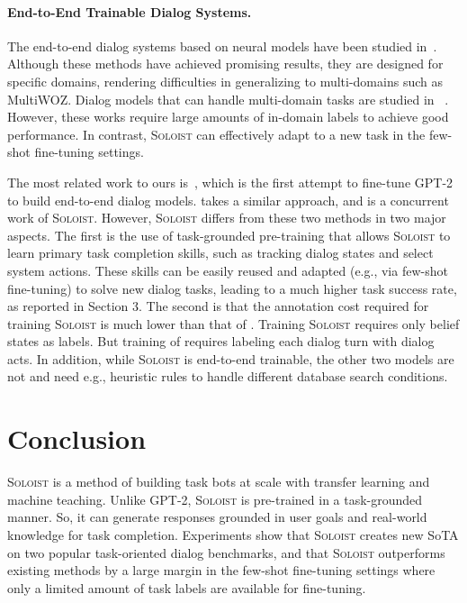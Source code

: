 \documentclass[11pt,a4paper]{article}
\newcommand{\model}{\textsc{Soloist}}
\begin{document}
\paragraph{End-to-End Trainable Dialog Systems.} 
The end-to-end dialog systems based on neural models have been studied in~\citet{wen2016network,li2017end,lei2018sequicity,haotian2019end}. 
Although these methods have achieved promising results, they are designed for specific domains, rendering difficulties in generalizing to multi-domains such as MultiWOZ. 
Dialog models that can handle multi-domain tasks are studied in 
~\cite{pei2019modular,budzianowski2019hello,mehri2019structured,zhao2019rethinking,wu2019alternating,zhang2019task,peng2017composite}. 
However, these works require large amounts of in-domain labels to achieve good performance.
In contrast, \model{} can effectively adapt to a new task in the few-shot fine-tuning settings.

The most related work to ours is~\citet{Ham2020e2e}, which is the first attempt to fine-tune GPT-2 to build end-to-end dialog models. \citet{hosseini2020simple}  takes a similar approach, and is a concurrent work of \model{}. 
However, \model{} differs from these two methods in two major aspects.
The first is the use of task-grounded pre-training that allows \model{} to learn primary task completion skills, such as tracking dialog states and select system actions. These skills can be easily reused and adapted (e.g., via few-shot fine-tuning) to solve new dialog tasks, leading to a much higher task success rate, as reported in Section 3. 
The second is that the annotation cost required for training \model{} is much lower than that of \citet{Ham2020e2e,hosseini2020simple}.
Training \model{} requires only belief states as labels. But training of \citet{Ham2020e2e,hosseini2020simple} requires labeling each dialog turn with dialog acts.
In addition, while \model{} is end-to-end trainable, the other two models are not and need e.g., heuristic rules to handle different database search conditions. 

\section{Conclusion}
\model{} is a method of building task bots at scale with transfer learning and machine teaching.
Unlike GPT-2, \model{} is pre-trained in a task-grounded manner. So, it can generate responses grounded in user goals and real-world knowledge for task completion. 
Experiments show that \model{} creates new SoTA on two popular task-oriented dialog benchmarks, and that   
\model{} outperforms existing methods by a large margin in the few-shot fine-tuning settings where only a limited amount of task labels are available for fine-tuning.  
\end{document}
